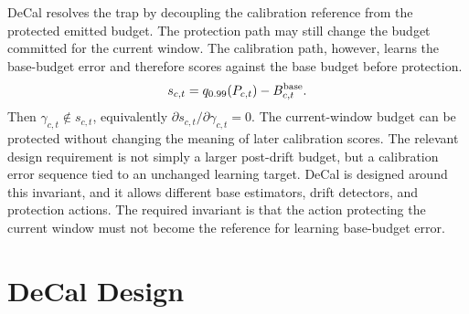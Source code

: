 \documentclass[sigplan,10pt, anonymous]{acmart}
\begin{document}
DeCal resolves the trap by decoupling the calibration reference from the protected emitted budget. The protection path may still change the budget committed for the current window. The calibration path, however, learns the base-budget error and therefore scores against the base budget before protection.
\begin{equation}
\label{eq:decoupled_score_sec2}
s_{c,t}=q_{0.99}(P_{c,t})-B_{c,t}^{\rm base}.
\end{equation}
Then $\gamma_{c,t}\notin s_{c,t}$, equivalently $\partial s_{c,t}/\partial \gamma_{c,t}=0$. The current-window budget can be protected without changing the meaning of later calibration scores. The relevant design requirement is not simply a larger post-drift budget, but a calibration error sequence tied to an unchanged learning target. DeCal is designed around this invariant, and it allows different base estimators, drift detectors, and protection actions. The required invariant is that the action protecting the current window must not become the reference for learning base-budget error.




\section{DeCal Design}
\label{sec:design}
\end{document}
